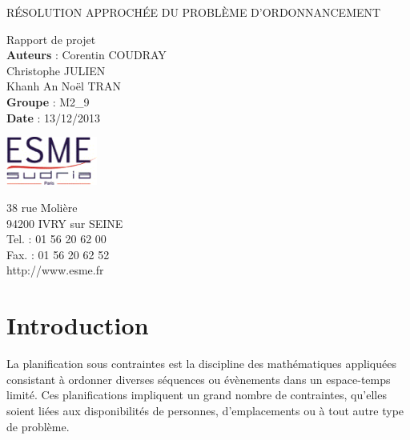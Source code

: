 \documentclass[12pt,a4paper,french]{article}
\begin{document}
\begin{titlepage}
	\begin{center}
		\begin{spacing}{2}
		{ \Huge{ RÉSOLUTION APPROCHÉE DU PROBLÈME D’ORDONNANCEMENT}}\\[1cm]
		\end{spacing}
		{ \Large{Rapport de projet}}\\[10cm]
		
		\textbf{Auteurs} : 
			Corentin COUDRAY \\
			Christophe JULIEN \\
			Khanh An Noël TRAN \\ 
		\textbf{Groupe} : M2\_9\\
		\textbf{Date} : 13/12/2013\\[2 cm]
	\end{center}	
	\vfill 
	\begin{minipage}[b]{0.3\linewidth}
		\includegraphics[width=30mm]{logo.png}
	\end{minipage}
	\hfill
	\begin{minipage}[b]{0.3\linewidth}
		{\footnotesize{38 rue Molière}}\\
		{\footnotesize{94200 IVRY sur SEINE}}\\
		{\footnotesize{Tel. : 01 56 20 62 00}}\\
		{\footnotesize{Fax. : 01 56 20 62 52}}\\
		{\footnotesize{http://www.esme.fr}}
	\end{minipage}
\end{titlepage}


\renewcommand{\contentsname}{Sommaire}
\tableofcontents
\newpage

\section{Introduction}

La planification sous contraintes est la discipline des mathématiques appliquées consistant à ordonner diverses séquences ou évènements dans un espace-temps limité. Ces planifications impliquent un grand nombre de contraintes, qu'elles soient liées aux disponibilités de personnes, d'emplacements ou à tout autre type de problème.\\
\end{document}
